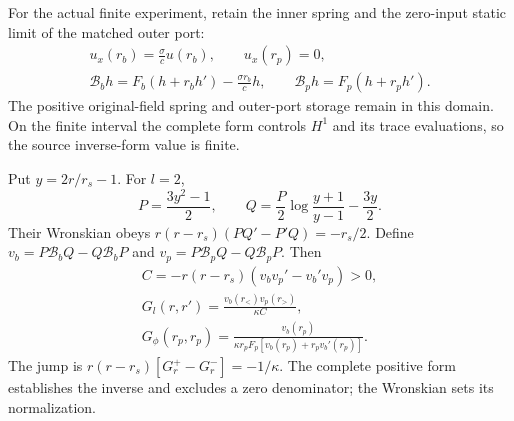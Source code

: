 \documentclass[10pt,twocolumn,letterpaper]{article}
\begin{document}
For the actual finite experiment, retain the inner spring and the
zero-input static limit of the matched outer port:
\begin{equation}
\begin{gathered}
 u_x(r_b)=\frac\sigma c u(r_b),\qquad u_x(r_p)=0,\\
 \mathcal B_bh=F_b(h+r_bh')-\frac{\sigma r_b}{c}h,
 \qquad \mathcal B_ph=F_p(h+r_ph').
\end{gathered}
\label{eq:li-static-BC}
\end{equation}
The positive original-field spring and outer-port storage remain in this
domain. On the finite interval the complete form controls $H^1$ and its
trace evaluations, so the source inverse-form value is finite.

Put $y=2r/r_s-1$. For $l=2$,
\begin{equation}
 P=\frac{3y^2-1}{2},\qquad
 Q=\frac P2\log\frac{y+1}{y-1}-\frac{3y}{2}.
\end{equation}
Their Wronskian obeys
$r(r-r_s)(PQ'-P'Q)=-r_s/2$. Define
$v_b=P\mathcal B_bQ-Q\mathcal B_bP$ and
$v_p=P\mathcal B_pQ-Q\mathcal B_pP$. Then
\begin{equation}
\begin{gathered}
 C=-r(r-r_s)(v_bv_p'-v_b'v_p)>0,\\
 G_l(r,r')=\frac{v_b(r_<)v_p(r_>)}{\kappa C},\\
 G_\phi(r_p,r_p)=
 \frac{v_b(r_p)}{\kappa r_pF_p[v_b(r_p)+r_pv_b'(r_p)]}.
\end{gathered}
\label{eq:li-finite-G}
\end{equation}
The jump is $r(r-r_s)[G_r^+-G_r^-]=-1/\kappa$.
The complete positive form establishes the inverse and excludes a zero
denominator; the Wronskian sets its normalization.
\end{document}
